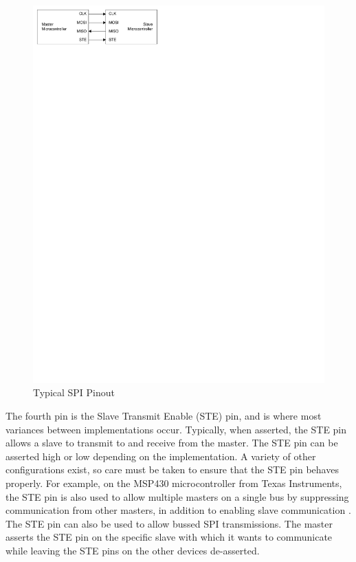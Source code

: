 \begin{figure}[ptb]
	\begin{centering}
		\includegraphics{SPI/Figures/spi-typical_pinout.pdf}
		\caption{Typical SPI Pinout}
		\label{fig:spi:typical_pinout}
	\end{centering}
\end{figure}

The fourth pin is the Slave Transmit Enable (STE) pin, and is where most variances between implementations occur. Typically, when asserted, the STE pin allows a slave to transmit to and receive from the master. The STE pin can be asserted high or low depending on the implementation. A variety of other configurations exist, so care must be taken to ensure that the STE pin behaves properly. For example, on the MSP430 microcontroller from Texas Instruments, the STE pin is also used to allow multiple masters on a single bus by suppressing communication from other masters, in addition to enabling slave communication \cite{ref:2009-ti-msp430}. The STE pin can also be used to allow bussed SPI transmissions. The master asserts the STE pin on the specific slave with which it wants to communicate while leaving the STE pins on the other devices de-asserted.

